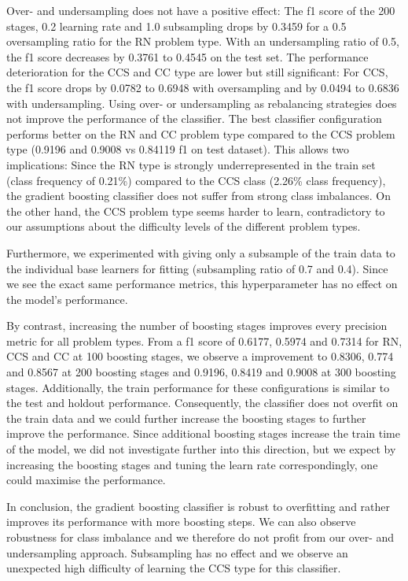 Over- and undersampling does not have a positive effect: The f1 score of the 200 stages, 0.2 learning rate and 1.0 subsampling drops by 0.3459 for a 0.5 oversampling ratio for the RN problem type. With an undersampling ratio of 0.5, the f1 score decreases by 0.3761 to 0.4545 on the test set. The performance deterioration for the CCS and CC type are lower but still significant: For CCS, the f1 score drops by 0.0782 to 0.6948 with oversampling and by 0.0494 to 0.6836 with undersampling. Using over- or undersampling as rebalancing strategies does not improve the performance of the classifier. The best classifier configuration performs better on the RN and CC problem type compared to the CCS problem type (0.9196 and 0.9008 vs 0.84119 f1 on test dataset). This allows two implications: Since the RN type is strongly underrepresented in the train set (class frequency of 0.21\%) compared to the CCS class (2.26\% class frequency), the gradient boosting classifier does not suffer from strong class imbalances. On the other hand, the CCS problem type seems harder to learn, contradictory to our assumptions about the difficulty levels of the different problem types.

Furthermore, we experimented with giving only a subsample of the train data to the individual base learners for fitting (subsampling ratio of 0.7 and 0.4). Since we see the exact same performance metrics, this hyperparameter has no effect on the model's performance.

By contrast, increasing the number of boosting stages improves every precision metric for all problem types. From a f1 score of 0.6177, 0.5974 and 0.7314 for RN, CCS and CC at 100 boosting stages, we observe a improvement to 0.8306, 0.774 and 0.8567 at 200 boosting stages and 0.9196, 0.8419 and 0.9008 at 300 boosting stages. Additionally, the train performance for these configurations is similar to the test and holdout performance. Consequently, the classifier does not overfit on the train data and we could further increase the boosting stages to further improve the performance. Since additional boosting stages increase the train time of the model, we did not investigate further into this direction, but we expect by increasing the boosting stages and tuning the learn rate correspondingly, one could maximise the performance. 

In conclusion, the gradient boosting classifier is robust to overfitting and rather improves its performance with more boosting steps. We can also observe robustness for class imbalance and we therefore do not profit from our over- and undersampling approach. Subsampling has no effect and we observe an unexpected high difficulty of learning the CCS type for this classifier.




